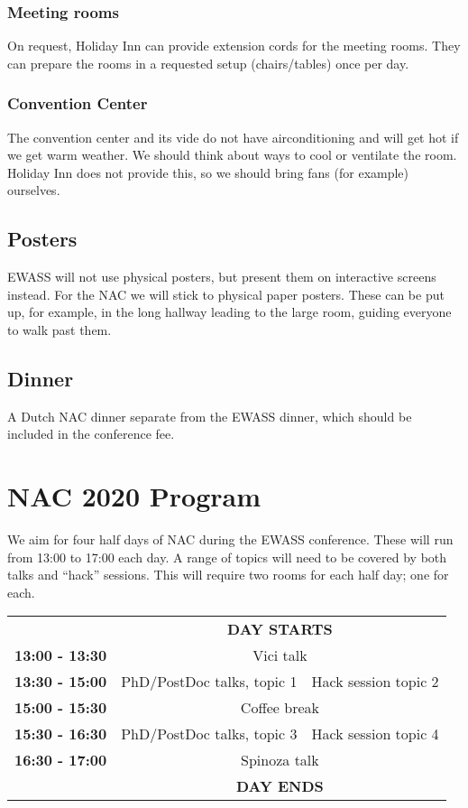 \documentclass{article}
\begin{document}
\subsubsection*{Meeting rooms}
On request, Holiday Inn can provide extension cords for the meeting rooms. They can prepare the rooms in a requested setup (chairs/tables) once per day.

\subsubsection*{Convention Center}
The convention center and its vide do not have airconditioning and will get hot if we get warm weather. We should think about ways to cool or ventilate the room. Holiday Inn does not provide this, so we should bring fans (for example) ourselves.




\subsection{Posters}
EWASS will not use physical posters, but present them on interactive screens instead. For the NAC we will stick to physical paper posters. These can be put up, for example, in the long hallway leading to the large room, guiding everyone to walk past them.

\subsection{Dinner}
A Dutch NAC dinner separate from the EWASS dinner, which should be included in the conference fee.

\section{NAC 2020 Program}
We aim for four half days of NAC during the EWASS conference. These will run from 13:00 to 17:00 each day. A range of topics will need to be covered by both talks and ``hack'' sessions. This will require two rooms for each half day; one for each.

\begin{tabular}{ll|l}
    & \multicolumn{2}{c}{\textbf{DAY STARTS}} \\
    \cline{2-3}
    \textbf{13:00 - 13:30} & \multicolumn{2}{c}{Vici talk} \\
    \textbf{13:30 - 15:00} & PhD/PostDoc talks, topic 1 & Hack session topic 2 \\
    \textbf{15:00 - 15:30} & \multicolumn{2}{c}{Coffee break} \\
    \textbf{15:30 - 16:30} & PhD/PostDoc talks, topic 3 & Hack session topic 4 \\
    \textbf{16:30 - 17:00} & \multicolumn{2}{c}{Spinoza talk} \\
    \cline{2-3}
    & \multicolumn{2}{c}{\textbf{DAY ENDS}}
\end{tabular}\\%
\end{document}
